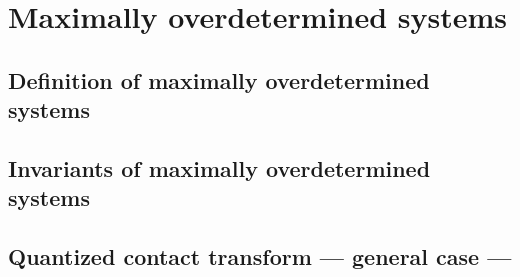 \section{Maximally overdetermined systems}

\subsection{Definition of maximally overdetermined systems}

\subsection{Invariants of maximally overdetermined systems}

\subsection{Quantized contact transform --- general case ---}